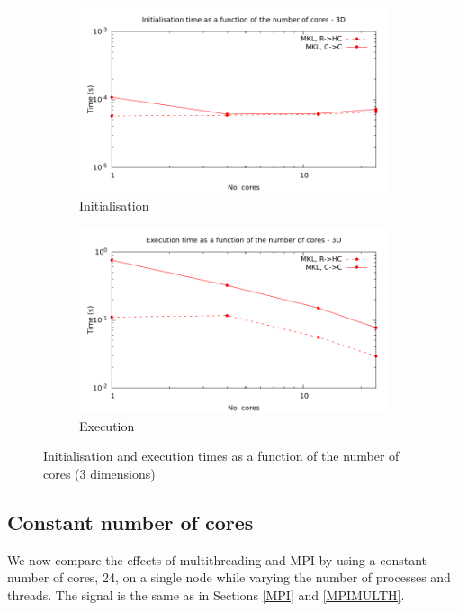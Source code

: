 \documentclass[12pt, a4paper]{article} \setlength{\textheight}{24cm}
\begin{document}
\begin{figure}[H]
  \centering
  \begin{subfigure}{.5\textwidth}
    \centering
    \includegraphics[width=.9\linewidth]{graphs/mpi-multh-init-3d.pdf}
    \caption{Initialisation}
    \label{3DMPIMULTHI}
  \end{subfigure}%
  \begin{subfigure}{.5\textwidth}
    \centering
    \includegraphics[width=.9\linewidth]{graphs/mpi-multh-exec-3d.pdf}
    \caption{Execution}
    \label{3DMPIMULTHE}
  \end{subfigure}
  \caption{Initialisation and execution times as a function of the
    number of cores (3 dimensions)}
  \label{3DMPIMULTH}
\end{figure}

\subsection{Constant number of cores}\label{CONST}
We now compare the effects of multithreading and MPI by using a
constant number of cores, 24, on a single node while varying the
number of processes and threads. The signal is the same as in Sections
\ref{MPI} and \ref{MPIMULTH}.
\end{document}
